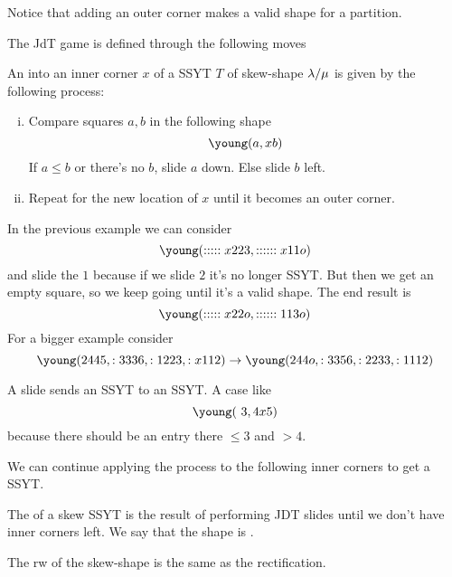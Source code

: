 \documentclass[12pt]{memoir}
\begin{document}
\begin{Rmk}
    Notice that adding an outer corner makes a valid shape for a partition.
\end{Rmk}

The JdT game is defined through the following moves
\begin{Def}
    An  into an inner corner $x$ of a SSYT $T$ of skew-shape $\lambda/\mu$ is given by the following process:
    \begin{enumerate}[i)]
        \itemsep=-0.4em
        \item Compare squares $a,b$ in the following shape 
        $$\young(a,xb)$$
        If $a\leq b$ or there's no $b$, slide $a$ down. Else slide $b$ left.
        \item Repeat for the new location of $x$ until it becomes an outer corner.
    \end{enumerate}
\end{Def}

\begin{Ex}
    In the previous example we can consider 
    $$\young(:::::x223,::::::x11o)$$ and slide the $1$ because if we slide $2$ it's no longer SSYT. But then we get an empty square, so we keep going until it's a valid shape. The end result is 
    $$\young(:::::x22o,::::::113o)$$
    For a bigger example consider 
    $$\young(2445,:3336,:1223,:x112)\to\young(244o,:3356,:2233,:1112)$$
\end{Ex}

\begin{Rmk}
    A slide sends an SSYT to an SSYT. A case like 
    $$\young(~3,4x5)$$
    because there should be an entry there $\leq 3$ and $>4$. 
\end{Rmk}

We can continue applying the process to the following inner corners to get a SSYT. 

\begin{Def}
    The  of a skew SSYT is the result of performing JDT slides until we don't have inner corners left. We say that the shape is .
\end{Def}

\begin{Rmk}
    The rw of the skew-shape is the same as the rectification.
\end{Rmk}
\ifx\nextra\undefined
\printindex
\else\fi
\nocite{*}


\end{document}
